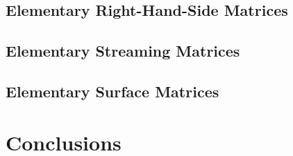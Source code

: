 \subsection{Elementary Right-Hand-Side Matrices}
\label{sec::Sn_Spatial_Mass}

\subsection{Elementary Streaming Matrices}
\label{sec::Sn_Spatial_Streaming}

\subsection{Elementary Surface Matrices}
\label{sec::Sn_Spatial_Surface}


\section{Conclusions}
\label{sec::Sn_Conclusions}